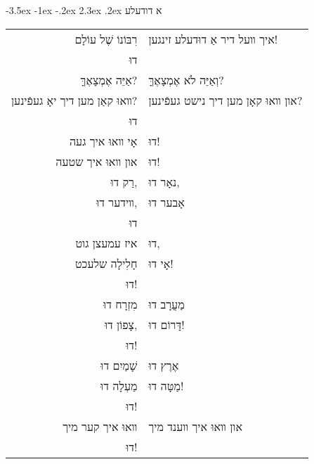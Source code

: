 \documentclass[12pt,letterpaper]{siddur}
\makeatletter
\renewcommand\section{\setcounter{mishnah}{0}\@startsection {section}{1}{\z@}%
                                   {-3.5ex \@plus -1ex \@minus -.2ex}%
                                   {2.3ex \@plus.2ex}%
                                   {\normalfont\large}}
\makeatother
\begin{document}
\section{א דודעלע}
\begin{longtable}[r]{r l}
רִבּוֹנוֹ שֶׁל עוֹלָם&
איך װעל דיר אַ דוּדעלע זינגען!\\
דוּ\\
אַיֵּה אֶמְצָאֶךָּ?&
וְאַיֵּה לֹא אֶמְצָאֶךָּ?\\
װאוּ קאַן מען דיך יאָ געפֿינען?&
און װאוּ קאָן מען דיך נישט געפֿינען?\\
דוּ\\
אָי װאוּ איך געה & דוּ!\\
און װאוּ איך שטעה & דוּ!\\
רַק דוּ,&
נאָר דוּ,\\
װידער דוּ,&
אָבער דוּ\\
דוּ\\
איז עמעצן גוט & דוּ,\\
חָלִילָה שלעכט & אָי דוּ!\\
דוּ!\\
מִזְרָח  דוּ&
מַעֲרָב דוּ\\
צָפוֹן דוּ,&
דָּרוֹם דוּ!\\
דוּ!\\
שָׁמַיִם דוּ&
אֶרֶץ דוּ\\
מַעְלָה דוּ&
מַטָּה דוּ!\\
דוּ!\\
װאוּ איך קער מיך&
און װאוּ איך װענד מיך\\
דוּ!
\end{longtable}
\end{document}
